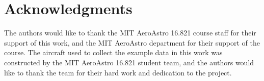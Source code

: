 \documentclass[conf]{new-aiaa}
\begin{document}
    \section*{Acknowledgments}
    The authors would like to thank the MIT AeroAstro 16.821 course staff for their support of this work, and the MIT AeroAstro department for their support of the course. The aircraft used to collect the example data in this work was constructed by the MIT AeroAstro 16.821 student team, and the authors would like to thank the team for their hard work and dedication to the project.

    
\end{document}
